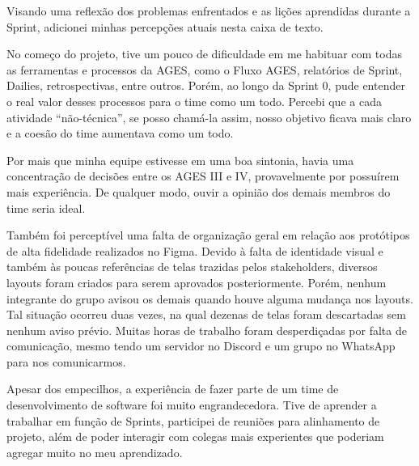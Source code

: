 \begin{reflection}
\indent \originaltab{}Visando uma reflexão dos problemas enfrentados e as lições aprendidas durante a Sprint, adicionei minhas percepções atuais nesta caixa de texto.\originalspace{}

\indent \originaltab{}No começo do projeto, tive um pouco de dificuldade em me habituar com todas as ferramentas e processos da AGES, como o Fluxo AGES, relatórios de Sprint, Dailies, retrospectivas, entre outros. Porém, ao longo da Sprint 0, pude entender o real valor desses processos para o time como um todo. Percebi que a cada atividade “não-técnica”, se posso chamá-la assim, nosso objetivo ficava mais claro e a coesão do time aumentava como um todo.

\indent \originaltab{}Por mais que minha equipe estivesse em uma boa sintonia, havia uma concentração de decisões entre os AGES III e IV, provavelmente por possuírem mais experiência. De qualquer modo, ouvir a opinião dos demais membros do time seria ideal.\originalspace{}

\indent \originaltab{}Também foi perceptível uma falta de organização geral em relação aos protótipos de alta fidelidade realizados no Figma. Devido à falta de identidade visual e também às poucas referências de telas trazidas pelos stakeholders, diversos layouts foram criados para serem aprovados posteriormente. Porém, nenhum integrante do grupo avisou os demais quando houve alguma mudança nos layouts. Tal situação ocorreu duas vezes, na qual dezenas de telas foram descartadas sem nenhum aviso prévio. Muitas horas de trabalho foram desperdiçadas por falta de comunicação, mesmo tendo um servidor no Discord e um grupo no WhatsApp para nos comunicarmos.

\indent \originaltab{}Apesar dos empecilhos, a experiência de fazer parte de um time de desenvolvimento de software foi muito engrandecedora. Tive de aprender a trabalhar em função de Sprints, participei de reuniões para alinhamento de projeto, além de poder interagir com colegas mais experientes que poderiam agregar muito no meu aprendizado.

\end{reflection}
